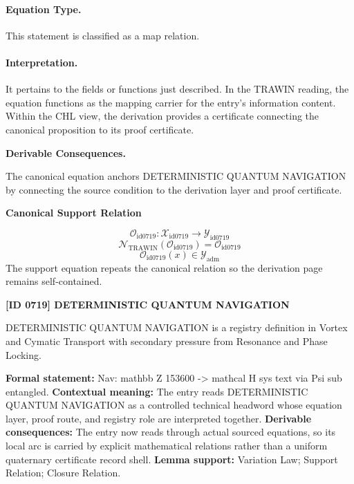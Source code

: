\paragraph{Equation Type.}
This statement is classified as a map relation.

\paragraph{Interpretation.}
It pertains to the fields or functions just described. In the TRAWIN reading, the equation functions as the mapping carrier for the entry’s information content. Within the CHL view, the derivation provides a certificate connecting the canonical proposition to its proof certificate.

\par\vspace{0.35em}
\noindent\textbf{Derivable Consequences.}\quad
\begingroup
\footnotesize
\raggedright
The canonical equation anchors DETERMINISTIC QUANTUM NAVIGATION by connecting the source condition to the derivation layer and proof certificate.
\par\endgroup

\noindent\textbf{Canonical Support Relation}\par
\[
\mathcal{O}_{\mathrm{id0719}}:\mathcal{X}_{\mathrm{id0719}}\longrightarrow\mathcal{Y}_{\mathrm{id0719}}
\]
\[
\mathcal{N}_{\mathrm{TRAWIN}}(\mathcal{O}_{\mathrm{id0719}})=\mathcal{O}_{\mathrm{id0719}}
\]
\[
\mathcal{O}_{\mathrm{id0719}}(x)\in\mathcal{Y}_{\mathrm{adm}}
\]
\noindent The support equation repeats the canonical relation so the derivation page remains self-contained.\par

\clearpage
\noindent\textbf{[ID 0719] DETERMINISTIC QUANTUM NAVIGATION}\par
\vspace{0.35em}
\begingroup\small
{}
DETERMINISTIC QUANTUM NAVIGATION is a registry definition in Vortex and Cymatic Transport with secondary pressure from Resonance and Phase Locking.

\begingroup\footnotesize\setlength{\emergencystretch}{3em}\sloppy
\textbf{Formal statement:} Nav: mathbb Z 153600 -> mathcal H sys text via Psi sub entangled. \textbf{Contextual meaning:} The entry reads DETERMINISTIC QUANTUM NAVIGATION as a controlled technical headword whose equation layer, proof route, and registry role are interpreted together. \textbf{Derivable consequences:} The entry now reads through actual sourced equations, so its local arc is carried by explicit mathematical relations rather than a uniform quaternary certificate record shell. \textbf{Lemma support:} Variation Law; Support Relation; Closure Relation.\par
\endgroup

